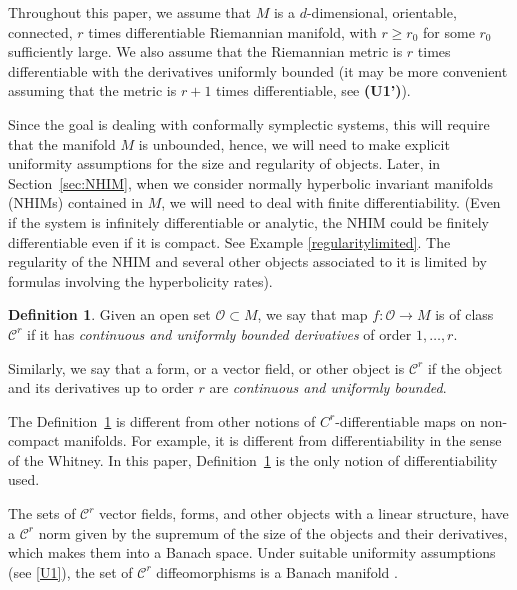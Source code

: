 \documentclass[11pt]{amsart}
\theoremstyle{definition}
\newtheorem{defn}[thm]{Definition}
\theoremstyle{remark}
\numberwithin{equation}{section}
\newcommand{\C}{\mathcal{C}}
\begin{document}
Throughout this paper, we assume that $M$ is  a $d$-dimensional, orientable,  connected,
$r$ times differentiable Riemannian manifold, with $r\ge r_0$ for some $r_0$ sufficiently large.
We also assume that the Riemannian metric is $r$ times differentiable with
the derivatives uniformly bounded (it may be more convenient
assuming  that the metric is $r+1$ times differentiable, see
{\bf (U1')}).

Since the goal is dealing with conformally symplectic systems,
this will require that the manifold $M$ is unbounded,
hence, we will need to make explicit uniformity assumptions for the size
and regularity of objects.
Later, in Section~\ref{sec:NHIM},  when we consider normally hyperbolic invariant manifolds (NHIMs)  contained in $M$, we will need to deal with finite differentiability. (Even if the system is infinitely differentiable or analytic,
 the NHIM could be  finitely differentiable even if it is compact.
See Example \ref{regularitylimited}. The regularity of the NHIM
and several other objects associated to it is limited by  formulas
involving the hyperbolicity rates).


\begin{defn}\label{def:Cr}
Given an open set $\mathcal{O} \subset M$,
we say that map  $f:\mathcal{O}\to M$ is of class $\C^r$ if it has
\emph{continuous and uniformly bounded derivatives} of order $1, \ldots, r$.

Similarly, we say that a form, or a vector field, or other
object    is $\C^r$ if
the object and its derivatives up to order $r$ are
\emph{continuous and uniformly bounded}.
\end{defn}

The Definition~\ref{def:Cr} is different from other notions
of $C^r$-differentiable maps on non-compact manifolds.
For example, it is different from differentiability in the sense of
the Whitney. In this paper, Definition~\ref{def:Cr}
is the only notion of differentiability used.



The sets of $\C^r$  vector fields,  forms, and other objects with a linear structure, have a $\C^r$ norm given by the supremum
of the size of the objects and their derivatives, which makes them into
a Banach space.
Under suitable uniformity assumptions (see \eqref{U1}), the set of $\C^r$ diffeomorphisms is a Banach manifold \cite{Banyaga97}.
\end{document}
